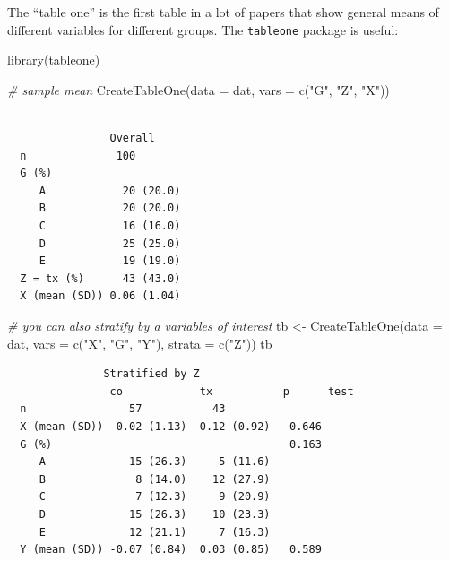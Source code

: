 \documentclass[
  letterpaper,
  DIV=11,
  numbers=noendperiod]{scrreprt}
\newenvironment{Shaded}{\begin{snugshade}}{\end{snugshade}}
\newcommand{\AttributeTok}[1]{\textcolor[rgb]{0.49,0.56,0.16}{#1}}
\newcommand{\CommentTok}[1]{\textcolor[rgb]{0.38,0.63,0.69}{\textit{#1}}}
\newcommand{\FunctionTok}[1]{\textcolor[rgb]{0.02,0.16,0.49}{#1}}
\newcommand{\NormalTok}[1]{\textcolor[rgb]{0.00,0.44,0.13}{#1}}
\newcommand{\OtherTok}[1]{\textcolor[rgb]{0.00,0.44,0.13}{#1}}
\newcommand{\StringTok}[1]{\textcolor[rgb]{0.25,0.44,0.63}{#1}}
\begin{document}
The ``table one'' is the first table in a lot of papers that show
general means of different variables for different groups. The
\texttt{tableone} package is useful:

\begin{Shaded}
\begin{Highlighting}[]
\FunctionTok{library}\NormalTok{(tableone)}

\CommentTok{\# sample mean  }
\FunctionTok{CreateTableOne}\NormalTok{(}\AttributeTok{data =}\NormalTok{ dat,}
               \AttributeTok{vars =} \FunctionTok{c}\NormalTok{(}\StringTok{"G"}\NormalTok{, }\StringTok{"Z"}\NormalTok{, }\StringTok{"X"}\NormalTok{))}
\end{Highlighting}
\end{Shaded}

\begin{verbatim}
               
                Overall     
  n              100        
  G (%)                     
     A            20 (20.0) 
     B            20 (20.0) 
     C            16 (16.0) 
     D            25 (25.0) 
     E            19 (19.0) 
  Z = tx (%)      43 (43.0) 
  X (mean (SD)) 0.06 (1.04) 
\end{verbatim}

\begin{Shaded}
\begin{Highlighting}[]
\CommentTok{\# you can also stratify by a variables of interest}
\NormalTok{tb }\OtherTok{\textless{}{-}} \FunctionTok{CreateTableOne}\NormalTok{(}\AttributeTok{data =}\NormalTok{ dat,}
                     \AttributeTok{vars =} \FunctionTok{c}\NormalTok{(}\StringTok{"X"}\NormalTok{, }\StringTok{"G"}\NormalTok{, }\StringTok{"Y"}\NormalTok{), }
                     \AttributeTok{strata =} \FunctionTok{c}\NormalTok{(}\StringTok{"Z"}\NormalTok{))}
\NormalTok{tb}
\end{Highlighting}
\end{Shaded}

\begin{verbatim}
               Stratified by Z
                co            tx           p      test
  n                57           43                    
  X (mean (SD))  0.02 (1.13)  0.12 (0.92)   0.646     
  G (%)                                     0.163     
     A             15 (26.3)     5 (11.6)             
     B              8 (14.0)    12 (27.9)             
     C              7 (12.3)     9 (20.9)             
     D             15 (26.3)    10 (23.3)             
     E             12 (21.1)     7 (16.3)             
  Y (mean (SD)) -0.07 (0.84)  0.03 (0.85)   0.589     
\end{verbatim}
\end{document}
